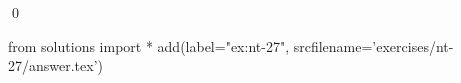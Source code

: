 
\begin{ex} 
  \label{ex:nt-27}
  
  \qed
\end{ex} 
\begin{python0}
from solutions import *
add(label="ex:nt-27",
    srcfilename='exercises/nt-27/answer.tex') 
\end{python0}
